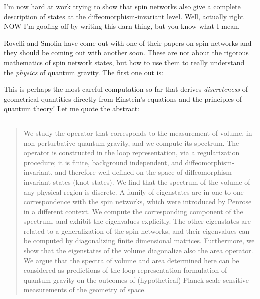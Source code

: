 \documentclass{article}
\def\tightlist{}
\renewcommand{\texttt}[1]{%
  \begingroup
  \ttfamily
  \begingroup\lccode`~=`/\lowercase{\endgroup\def~}{/\discretionary{}{}{}}%
  \begingroup\lccode`~=`[\lowercase{\endgroup\def~}{[\discretionary{}{}{}}%
  \begingroup\lccode`~=`.\lowercase{\endgroup\def~}{.\discretionary{}{}{}}%
  \catcode`/=\active\catcode`[=\active\catcode`.=\active
  \scantokens{#1\noexpand}%
  \endgroup
}
\begin{document}
I'm now hard at work trying to show that spin networks also give a
complete description of states at the diffeomorphism-invariant level.
Well, actually right NOW I'm goofing off by writing this darn thing, but
you know what I mean.

Rovelli and Smolin have come out with one of their papers on spin
networks and they should be coming out with another soon. These are not
about the rigorous mathematics of spin network states, but how to use
them to really understand the \emph{physics} of quantum gravity. The
first one out is:


This is perhaps the most careful computation so far that derives
\emph{discreteness} of geometrical quantities directly from Einstein's
equations and the principles of quantum theory! Let me quote the
abstract:

\begin{center}\rule{0.5\linewidth}{0.5pt}\end{center}

\begin{quote}
We study the operator that corresponds to the measurement of volume, in
non-perturbative quantum gravity, and we compute its spectrum. The
operator is constructed in the loop representation, via a regularization
procedure; it is finite, background independent, and
diffeomorphism-invariant, and therefore well defined on the space of
diffeomorphism invariant states (knot states). We find that the spectrum
of the volume of any physical region is discrete. A family of
eigenstates are in one to one correspondence with the spin networks,
which were introduced by Penrose in a different context. We compute the
corresponding component of the spectrum, and exhibit the eigenvalues
explicitly. The other eigenstates are related to a generalization of the
spin networks, and their eigenvalues can be computed by diagonalizing
finite dimensional matrices. Furthermore, we show that the eigenstates
of the volume diagonalize also the area operator. We argue that the
spectra of volume and area determined here can be considered as
predictions of the loop-representation formulation of quantum gravity on
the outcomes of (hypothetical) Planck-scale sensitive measurements of
the geometry of space.
\end{quote}
\end{document}
